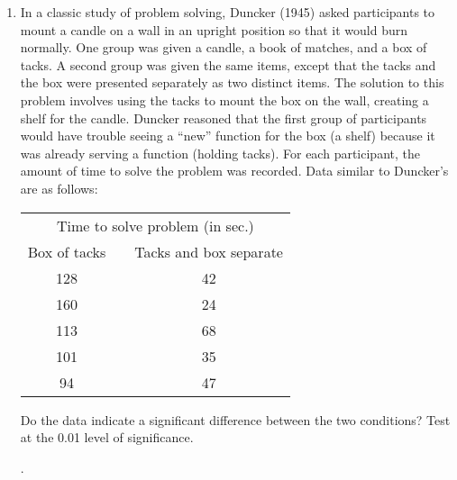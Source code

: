 \documentclass[12pt]{article}%
\begin{document}
\begin{enumerate}
\begin{table}[h!]
\begin{center}
\begin{tabular}{cp{1cm}c}
	\end{tabular}
	\end{center}
	
\end{table}

\newpage


\item In a classic study of problem solving, Duncker (1945) asked participants to mount a candle on a wall in an upright position so that it would burn normally.  One group was given a candle, a book of matches, and a box of tacks.  A second group was given the same items, except that the tacks and the box were presented separately as two distinct items.  The solution to this problem involves using the tacks to mount the box on the wall, creating a shelf for the candle.  Duncker reasoned that the first group of participants would have trouble seeing a ``new'' function for the box (a shelf) because it was already serving a function (holding tacks).  For each participant, the amount of time to solve the problem was recorded.  Data similar to Duncker's are as follows:

\begin{table}[h!]
	\begin{center}
	\begin{tabular}{cp{1cm}c}
		\multicolumn{3}{c}{Time to solve problem (in sec.)}\\
		Box of tacks & & Tacks and box separate\\
		\hline
		128 & & 42\\
		160 & & 24\\
		113 & & 68\\
		101 & & 35\\
		94 & & 47\\
		\hline
		
	\end{tabular}
	\end{center}

\end{table}

Do the data indicate a significant difference between the two conditions?  Test at the 0.01 level of significance.

\newpage
.
\end{enumerate}
\end{document}
